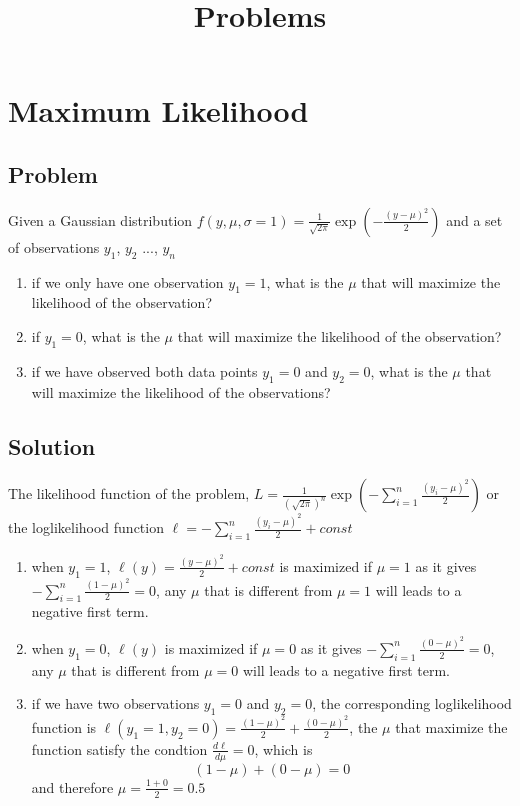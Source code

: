 \documentclass{article}
\title{Problems} %
\begin{document}
\maketitle %
\thispagestyle{fancy}
\pagestyle{fancy}

\section{Maximum Likelihood}
\subsection{Problem}

Given a Gaussian distribution $f(y,\mu, \sigma=1)=\frac{1}{\sqrt{2\pi}}\exp(-\frac{(y-\mu)^2}{2})$ and a set of observations $y_1$, $y_2$ ..., $y_n$

\begin{enumerate}
\item  if we only have one observation $y_1=1$, what is the $\mu$ that will maximize the likelihood of the observation?
\item  if $y_1=0$, what is the $\mu$ that will maximize the likelihood of the observation?
\item  if we have observed both data points $y_1=0$ and $y_2=0$, what is the $\mu$ that will maximize the likelihood of the observations?
\end{enumerate}

\subsection{Solution}
The likelihood function of the problem, $L=\frac{1}{(\sqrt{2\pi})^n}\exp\left( -\sum\limits_{i=1}^n\frac{(y_i-\mu)^2}{2}\right)$ or the loglikelihood function $\ell=-\sum\limits_{i=1}^n\frac{(y_i-\mu)^2}{2}+const$
\begin{enumerate}
\item when $y_1=1$, $\ell(y)=\frac{(y-\mu)^2}{2}+const$ is maximized if $\mu=1$ as it gives $-\sum\limits_{i=1}^n\frac{(1-\mu)^2}{2}=0$, any $\mu$ that is different from $\mu=1$ will leads to a negative first term.
\item when $y_1=0$, $\ell(y)$ is maximized if $\mu=0$ as it gives $-\sum\limits_{i=1}^n\frac{(0-\mu)^2}{2}=0$, any $\mu$ that is different from $\mu=0$ will leads to a negative first term.
\item  if we have two observations $y_1=0$ and $y_2=0$, the corresponding loglikelihood function is $\ell(y_1=1,y_2=0)=\frac{(1-\mu)^2}{2}+\frac{(0-\mu)^2}{2}$, the $\mu$ that maximize the function satisfy the condtion $\frac{d\ell}{d\mu}=0$, which is 
$$(1-\mu)+(0-\mu)=0$$ and therefore $\mu=\frac{1+0}{2}=0.5$
\end{enumerate}
\end{document}
